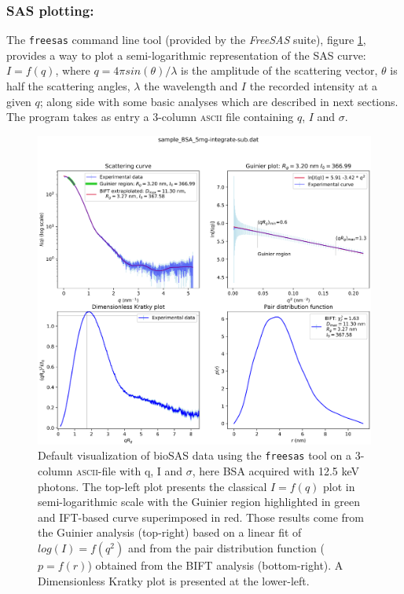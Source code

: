 \documentclass[preprint]{iucr}              %
\begin{document}
\subsubsection{SAS plotting:} The \texttt{freesas} command line tool (provided by the \textit{FreeSAS} suite), figure \ref{plot}, provides a way to plot a semi-logarithmic representation of the SAS curve: $I=f(q)$, where $q = 4\pi sin(\theta)/\lambda$ is the amplitude of the scattering vector, $\theta$ is half the scattering angles, $\lambda$ the wavelength and $I$ the recorded intensity at a given $q$; along side with some basic analyses which are described in next sections.
The program takes as entry a 3-column \textsc{ascii} file containing $q$, $I$ and $\sigma$. 

\begin{figure}
\label{plot}
\includegraphics[width=12cm]{Figure_1.eps}
\caption{Default visualization of bioSAS data using the \texttt{freesas} tool on a 3-column \textsc{ascii}-file with q, I and $\sigma$, here BSA acquired with 12.5 keV photons. 
The top-left plot presents the classical $I=f(q)$ plot in semi-logarithmic scale with the Guinier region highlighted in green and IFT-based curve superimposed in red. Those results come from the Guinier analysis (top-right) based on a linear fit of $log(I)=f(q^2)$ and from the pair distribution function ($p=f(r)$) obtained from the BIFT analysis (bottom-right).
A Dimensionless Kratky plot is presented at the lower-left. 
}
\end{figure}
\end{document}
